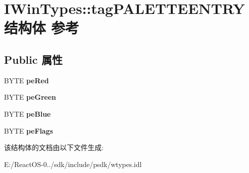 \hypertarget{struct_i_win_types_1_1tag_p_a_l_e_t_t_e_e_n_t_r_y}{}\section{I\+Win\+Types\+:\+:tag\+P\+A\+L\+E\+T\+T\+E\+E\+N\+T\+R\+Y结构体 参考}
\label{struct_i_win_types_1_1tag_p_a_l_e_t_t_e_e_n_t_r_y}
\subsection*{Public 属性}
\begin{DoxyCompactItemize}
\item 
\mbox{\label{struct_i_win_types_1_1tag_p_a_l_e_t_t_e_e_n_t_r_y_a47d650f40472262dade9a9ee6e7979e6}} 
B\+Y\+TE {\bfseries pe\+Red}
\item 
\mbox{\label{struct_i_win_types_1_1tag_p_a_l_e_t_t_e_e_n_t_r_y_a832c0dfa2846d31fbfe085e7bdf6b8f1}} 
B\+Y\+TE {\bfseries pe\+Green}
\item 
\mbox{\label{struct_i_win_types_1_1tag_p_a_l_e_t_t_e_e_n_t_r_y_af01373d360ee0a26a030b6ea55875de6}} 
B\+Y\+TE {\bfseries pe\+Blue}
\item 
\mbox{\label{struct_i_win_types_1_1tag_p_a_l_e_t_t_e_e_n_t_r_y_ad81f28aff06cb5e5845e11f607807ea1}} 
B\+Y\+TE {\bfseries pe\+Flags}
\end{DoxyCompactItemize}


该结构体的文档由以下文件生成\+:\begin{DoxyCompactItemize}
\item 
E\+:/\+React\+O\+S-\/0../sdk/include/psdk/wtypes.\+idl\end{DoxyCompactItemize}

